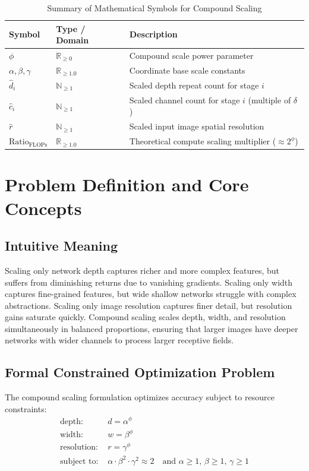 \documentclass[11pt,a4paper]{article}
\theoremstyle{definition}
\begin{document}
\begin{table}[h]
\centering
\caption{Summary of Mathematical Symbols for Compound Scaling}
\begin{tabular}{lll}
\toprule
\textbf{Symbol} & \textbf{Type / Domain} & \textbf{Description} \\
\midrule
$\phi$ & $\mathbb{R}_{\ge 0}$ & Compound scale power parameter \\
$\alpha, \beta, \gamma$ & $\mathbb{R}_{\ge 1.0}$ & Coordinate base scale constants \\
$\hat{d}_i$ & $\mathbb{N}_{\ge 1}$ & Scaled depth repeat count for stage $i$ \\
$\hat{c}_i$ & $\mathbb{N}_{\ge 1}$ & Scaled channel count for stage $i$ (multiple of $\delta$) \\
$\hat{r}$ & $\mathbb{N}_{\ge 1}$ & Scaled input image spatial resolution \\
$\text{Ratio}_{\text{FLOPs}}$ & $\mathbb{R}_{\ge 1.0}$ & Theoretical compute scaling multiplier ($\approx 2^\phi$) \\
\bottomrule
\end{tabular}
\end{table}

\section{Problem Definition and Core Concepts}

\subsection{Intuitive Meaning}
Scaling only network depth captures richer and more complex features, but suffers from diminishing returns due to vanishing gradients. Scaling only width captures fine-grained features, but wide shallow networks struggle with complex abstractions. Scaling only image resolution captures finer detail, but resolution gains saturate quickly. Compound scaling scales depth, width, and resolution simultaneously in balanced proportions, ensuring that larger images have deeper networks with wider channels to process larger receptive fields.

\subsection{Formal Constrained Optimization Problem}
The compound scaling formulation optimizes accuracy subject to resource constraints:
\begin{align}
\text{depth: } & d = \alpha^\phi \\
\text{width: } & w = \beta^\phi \\
\text{resolution: } & r = \gamma^\phi \\
\text{subject to: } & \alpha \cdot \beta^2 \cdot \gamma^2 \approx 2 \quad \text{and } \alpha \ge 1, \, \beta \ge 1, \, \gamma \ge 1
\end{align}
\end{document}
